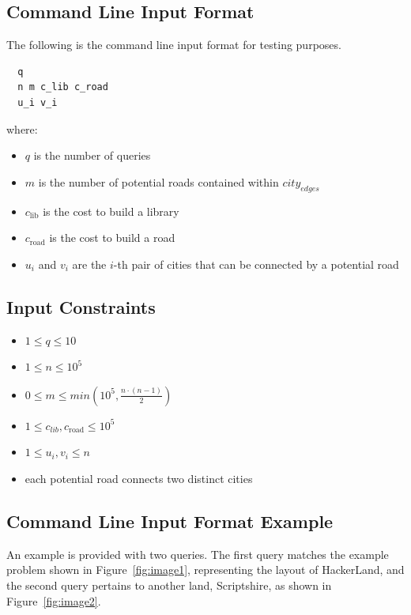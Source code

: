 \documentclass[11pt, a4paper, oneside]{article}
\begin{document}
\subsection*{Command Line Input Format}

The following is the command line input format for testing purposes.

\begin{verbatim}
  q
  n m c_lib c_road
  u_i v_i
\end{verbatim}

where:

\begin{itemize}
  \item \(q\) is the number of queries
  \item \(m\) is the number of potential roads contained within \(city_{edges}\)
  \item \(c_{\text{lib}}\) is the cost to build a library
  \item \(c_{\text{road}}\) is the cost to build a road
  \item \(u_{i}\) and \(v_{i}\) are the \(i\)-th pair of cities that can be connected by a potential road
\end{itemize}

\subsection*{Input Constraints}

\begin{itemize}
  \item \(1 \leq q \leq 10\)
  \item \(1 \leq n \leq 10^{5}\)
  \item \(0 \leq m \leq min \left(10^{5}, \frac{n\cdot(n - 1)}{2} \right)\)
  \item \(1 \leq c_{lib}, c_{\text{road}} \leq 10^{5}\)
  \item \(1 \leq u_{i}, v_{i} \leq n\)
  \item each potential road connects two distinct cities
\end{itemize}

\subsection*{Command Line Input Format Example}

An example is provided with two queries. The first query matches the example problem shown in Figure~\ref{fig:image1}, representing the layout of HackerLand, and the second query pertains to another land, Scriptshire, as shown in Figure~\ref{fig:image2}.
\end{document}
